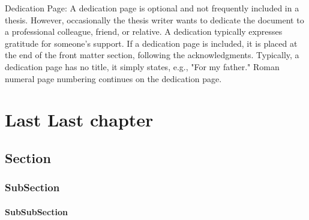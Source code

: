 \documentclass[12pt]{mines-thesis}
\begin{document}
\begin{dedication}
	Dedication Page: A dedication page is optional and not frequently included in a thesis. However, occasionally the thesis writer wants to dedicate the document to a professional colleague, friend, or relative. A dedication typically expresses gratitude for someone's support. If a dedication page is included, it is placed at the end of the front matter section, following the acknowledgments. Typically, a dedication page has no title, it simply states, e.g., "For my father." Roman numeral page numbering continues on the dedication page.
\end{dedication}	


\makefrontmatter


	








\chapter{Last Last chapter}
\lipsum[3]
\section{Section}
\lipsum[4]
\subsection{SubSection} 
\lipsum[4]
\subsubsection{SubSubSection}
\lipsum[4-5]
	
 
%

\appendix 


\end{document}
